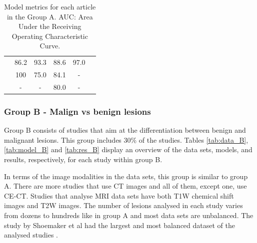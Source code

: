 \documentclass[11pt]{article}
\begin{document}
\begin{table}[]
\begin{tabular}{cccccc}
        \cite{Schieda2017}                  & 86.2                                       & 93.3                                       & 88.6                                    & 97.0                               \\
        \cite{Tu2020}                       & 100                                        & 75.0                                       & 84.1                                    & -                                  \\
        \cite{Romeo2018}                    & -                                          & -                                          & 80.0                                    & -                                  \\
        \bottomrule
    \end{tabular}
    \caption{Model metrics for each article in the Group A. AUC: Area Under the Receiving Operating Characteristic Curve.}
    \label{tab:res_A}
\end{table}

\subsubsection{Group B - Malign vs benign lesions}

Group B consists of studies that aim at the differentiation between benign and
malignant lesions. This group includes 30\% of the studies. Tables
\ref{tab:data_B}, \ref{tab:model_B} and \ref{tab:res_B} display an overview of
the data sets, models, and results, respectively, for each study within group B.

In terms of the image modalities in the data sets, this group is similar to
group A. There are more studies that use CT images and all of them, except one,
use CE-CT. Studies that analyse MRI data sets have both T1W chemical shift
images and T2W images. The number of lesions analysed in each study varies from
dozens to hundreds like in group A and most data sets are unbalanced. The study
by Shoemaker et al had the largest and most balanced dataset of the analysed
studies \cite{Shoemaker2018}.
\end{document}

